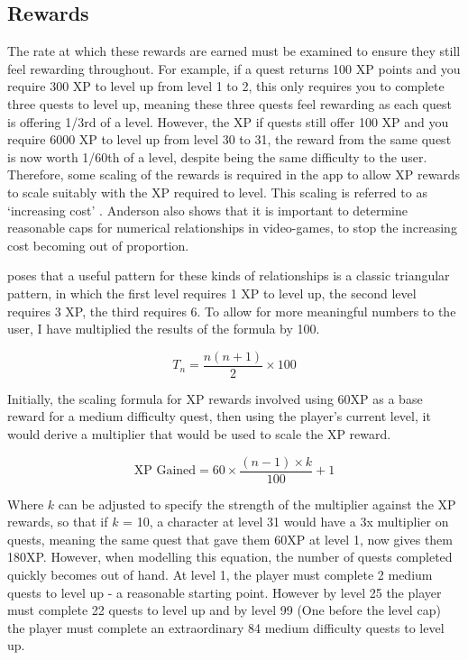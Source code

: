 \subsection{Rewards}
The rate at which these rewards are earned must be examined to ensure they still feel rewarding throughout. 
For example, if a quest returns 100 XP points and you require 300 XP to level up from level 1 to 2, this only requires you to complete three quests to level up, meaning these three quests feel rewarding as each quest is offering 1/3rd of a level.
However, the XP if quests still offer 100 XP and you require 6000 XP to level up from level 30 to 31, the reward from the same quest is now worth 1/60th of a level, despite being the same difficulty to the user.
Therefore, some scaling of the rewards is required in the app to allow XP rewards to scale suitably with the XP required to level.
This scaling is referred to as `increasing cost' \citep{1_anderson_2016}.
Anderson also shows that it is important to determine reasonable caps for numerical relationships in video-games, to stop the increasing cost becoming out of proportion.

\cite{1_anderson_2016} poses that a useful pattern for these kinds of relationships is a classic triangular pattern, in which the first level requires 1 XP to level up, the second level requires 3 XP, the third requires 6. To allow for more meaningful numbers to the user, I have multiplied the results of the formula by 100.

\begin{equation} \label{eq:xprequiredfornextlevel}
	T_n= \frac{n(n+1)}{2} \times 100
\end{equation}

Initially, the scaling formula for XP rewards involved using 60XP as a base reward for a medium difficulty quest, then using the player's current level, it would derive a multiplier that would be used to scale the XP reward.

\begin{equation} \label{eq:xpgainedlinear}
	\textrm{XP Gained} = 60 \times \frac{(n - 1) \times k}{100} + 1
\end{equation}

Where $k$ can be adjusted to specify the strength of the multiplier against the XP rewards, so that if $k$ = 10, a character at level 31 would have a 3x multiplier on quests, meaning the same quest that gave them 60XP at level 1, now gives them 180XP.
However, when modelling this equation, the number of quests completed quickly becomes out of hand. 
At level 1, the player must complete 2 medium quests to level up - a reasonable starting point.
However by level 25 the player must complete 22 quests to level up and by level 99 (One before the level cap) the player must complete an extraordinary 84 medium difficulty quests to level up.

